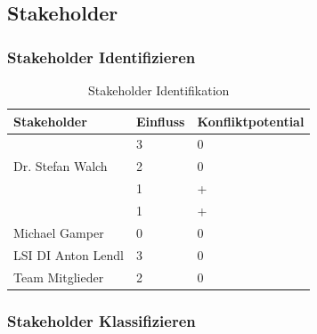 

\newpage
\subsection{Stakeholder}
\subsubsection{Stakeholder Identifizieren}
\begin{table}[h]
	\centering
	\begin{tabular}{|lll|}
		\hline
		Stakeholder          & Einfluss &  Konfliktpotential      \\ \hline                         
		\getHammerl & 3         & 0                  \\ 
		Dr. Stefan Walch     & 2         & 0                  \\
		\getSteff        & 1         & +                  \\ 
		\getAlex   & 1         & +                  \\ 
		Michael Gamper       & 0         & 0                  \\ 
		LSI DI Anton Lendl   & 3         & 0                  \\ 
		Team Mitglieder      & 2         & 0                   \\ \hline			
	\end{tabular}
	\caption{Stakeholder Identifikation}
	\label{Tbl_Stakeholder_Identifikation}
\end{table}


\subsubsection{Stakeholder Klassifizieren}	

